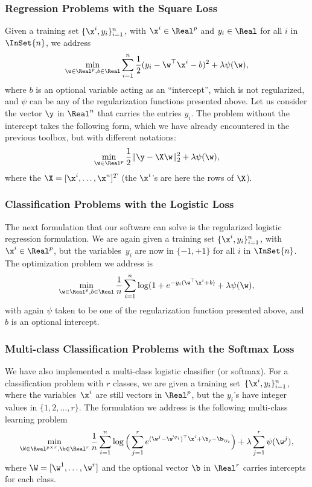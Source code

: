 \documentclass[a4paper, 11pt]{article}
\begin{document}
\subsubsection{Regression Problems with the Square Loss}  %
Given a training set $\{\x^i,y_i\}_{i=1}^n$, with $\x^i \in \Real^p$ and $y_i \in \Real$ for all $i$ in $\InSet{n}$, we address
\begin{displaymath}
\min_{\w \in \Real^p, b \in \Real} \sum_{i=1}^n \frac{1}{2}(y_i-\w^\top\x^i-b)^2 + \lambda\psi(\w),
\end{displaymath}
where $b$ is an optional variable acting as an ``intercept'', which is not regularized, and $\psi$
can be any of the regularization functions presented above. 
Let us consider the vector $\y$ in $\Real^n$ that carries the entries $y_i$. 
The problem without the intercept takes the following form, which we have already
encountered in the previous toolbox, but with different notations:
\begin{displaymath}
\min_{\w \in \Real^p} \frac{1}{2}\|\y-\X\w\|_2^2 + \lambda\psi(\w),
\end{displaymath}
where the $\X=[\x^i,\ldots,\x^n]^T$ (the $\x^i$'s are here the rows of $\X$).
\subsubsection{Classification Problems with the Logistic Loss}
The next formulation that our software can solve is the regularized logistic regression formulation.
We are again given a training set $\{\x^i,y_i\}_{i=1}^n$, with $\x^i \in
\Real^p$, but the variables~$y_i$ are now in $\{-1,+1\}$ for all $i$ in
$\InSet{n}$. The optimization problem we address is
\begin{displaymath}
\min_{\w \in \Real^p, b \in \Real} \frac{1}{n}\sum_{i=1}^n \log(1+e^{-y_i(\w^\top\x^i+b)} + \lambda\psi(\w),
\end{displaymath}
with again $\psi$ taken to be one of the regularization function presented above, and $b$ is an optional intercept.
\subsubsection{Multi-class Classification Problems with the Softmax Loss}
We have also implemented a multi-class logistic classifier (or softmax).
For a classification problem with $r$ classes, we are given a training set~$\{\x^i,y_i\}_{i=1}^n$, where the variables~$\x^i$ are still vectors in $\Real^p$, but the $y_i$'s have integer values in $\{1,2,\ldots,r\}$. The formulation we address is the following multi-class learning problem
\begin{equation}
    \min_{\W \in \Real^{p \times r}, \b \in \Real^r} \frac{1}{n}\sum_{i=1}^n \log\Big(\sum_{j=1}^r e^{ (\w^j-\w^{\y_i})^\top\x^i + \b_j-\b_{\y_i}}\Big) + \lambda\sum_{j=1}^r\psi(\w^j),\label{software:eq:class}
\end{equation}
where $\W = [\w^1,\ldots,\w^r]$ and the optional vector $\b$ in $\Real^r$ carries intercepts for each class.
\end{document}
